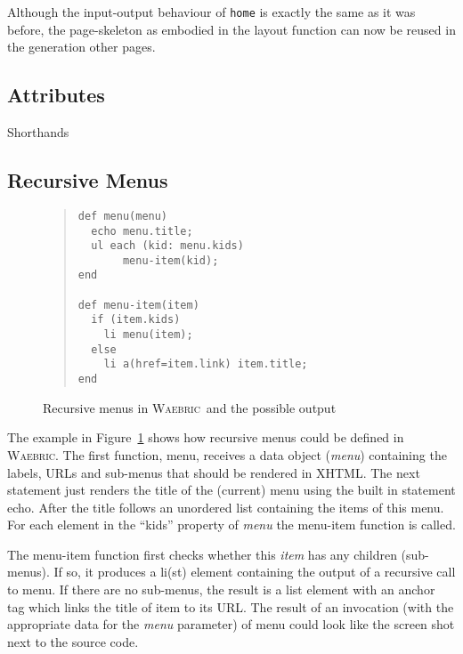 \documentclass[a4paper]{article}
\def\Waebric{\textsc{Waebric}\xspace}
\def\Var#1{\textit{#1}}
\begin{document}
Although the input-output behaviour of \texttt{home} is exactly the
same as it was before, the page-skeleton as embodied in the layout
function can now be reused in the generation other pages.


\subsection{Attributes}



Shorthands

\subsection{Recursive Menus}

\begin{figure}
\begin{quote}
\begin{minipage}{0.6\linewidth}
\begin{lstlisting}[language=waebric]
def menu(menu)
  echo menu.title;
  ul each (kid: menu.kids) 
       menu-item(kid);
end

def menu-item(item)
  if (item.kids)
    li menu(item);
  else
    li a(href=item.link) item.title;
end
\end{lstlisting}
\end{minipage}
\begin{minipage}[b]{0.4\linewidth}
\begin{center}
\end{center}
\end{minipage}
\end{quote}
\caption{Recursive menus in \Waebric\ and the possible
  output\label{FIG:menus}}
\end{figure}

The example in Figure~\ref{FIG:menus} shows how recursive menus could
be defined in \Waebric. The first function, menu, receives a data
object (\Var{menu}) containing the labels, URLs and sub-menus that
should be rendered in XHTML. The next statement just renders the title
of the (current) menu using the built in statement echo. After
the title follows an unordered list containing the items of this
menu. For each element in the ``kids'' property of \Var{menu} the
menu-item function is called.

The menu-item function first checks whether this \Var{item} has any
children (sub-menus). If so, it produces a li(st) element containing
the output of a recursive call to menu. If there are no sub-menus,
the result is a list element with an anchor tag which links the title
of item to its URL. The result of an invocation (with the appropriate
data for the \textit{menu} parameter) of menu could look like the
screen shot next to the source code.
\end{document}
